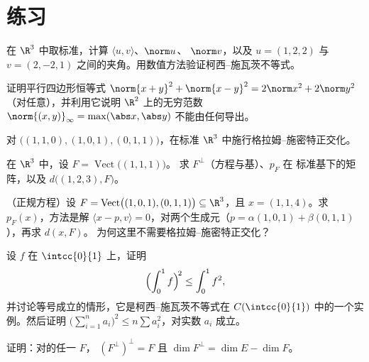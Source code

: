 \section{练习}

\begin{exercise}[$\star$]\label{exo:b1:euclid:1}
在 $\R^3$ 中取标准，计算 $\langle u, v\rangle$、$\norm u$、
$\norm v$，以及 $u = (1, 2, 2)$ 与 $v = (2, -2,
1)$ 之间的夹角。用数值方法验证柯西–施瓦茨不等式。
\end{exercise}

\begin{exercise}[$\star$]\label{exo:b1:euclid:2}
证明平行四边形恒等式 $\norm{x+y}^2 + \norm{x-y}^2 =
2\norm x^2 + 2\norm y^2$（对任意），并利用它说明
$\R^2$ 上的无穷范数 $\norm{(x,y)}_\infty = \max(\abs x,
\abs y)$ 不能由任何导出。
\end{exercise}

\begin{exercise}[$\star$]\label{exo:b1:euclid:3}
对 $\bigl((1,1,0), (1,0,1), (0,1,1)\bigr)$，在标准
$\R^3$ 中施行格拉姆–施密特正交化。
\end{exercise}

\begin{exercise}[$\star$]\label{exo:b1:euclid:4}
在 $\R^3$ 中，设 $F = \operatorname{Vect}\bigl((1,1,1)\bigr)$。
求 $F^\perp$（方程与基）、$p_F$ 在
标准基下的矩阵，以及 $d\bigl((1, 2, 3), F\bigr)$。
\end{exercise}

\begin{exercise}[$\star\star$]\label{exo:b1:euclid:5}
（正规方程）设 $F =
\operatorname{Vect}\bigl((1,0,1),(0,1,1)\bigr) \subseteq \R^3$，且
$x = (1, 1, 4)$。求 $p_F(x)$，方法是解 $\langle x - p, v
\rangle = 0$，对两个生成元（$p = \alpha(1,0,1) +
\beta(0,1,1)$），再求 $d(x, F)$。
为何这里不需要格拉姆–施密特正交化？
\end{exercise}

\begin{exercise}[$\star\star$]\label{exo:b1:euclid:6}
设 $f$ 在 $\intcc{0}{1}$ 上，证明
\[
\Bigl(\int_0^1 f\Bigr)^{\!2} \leq \int_0^1 f^2 ,
\]
并讨论等号成立的情形，它是柯西–施瓦茨不等式在
$C(\intcc{0}{1})$ 中的一个实例。然后证明 $\bigl(\sum_{i=1}^n a_i\bigr)^2 \leq
n \sum a_i^2$，对实数 $a_i$ 成立。
\end{exercise}

\begin{exercise}[$\star\star$]\label{exo:b1:euclid:7}
证明：对的任一 $F$，
$(F^{\perp})^{\perp} = F$ 且 $\dim F^{\perp} = \dim E - \dim F$。
\end{exercise}

